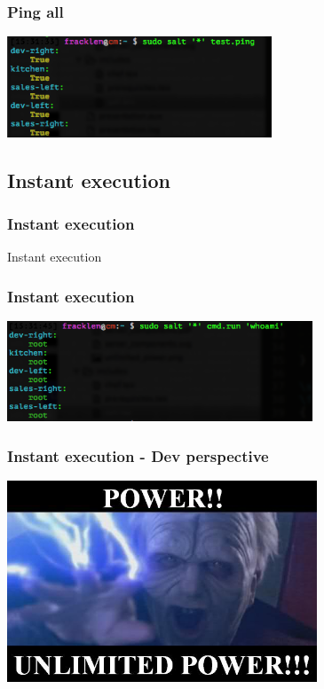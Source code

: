 \frame
{
  \frametitle{Ping all}

  \begin{center}%
    \includegraphics[height=3cm]{images/salt_ping.png}
  \end{center}%
}

\subsection{Instant execution}
\frame
{
  \frametitle{Instant execution}

  \begin{center}%
    \Huge Instant execution
  \end{center}%
}

\frame
{
  \frametitle{Instant execution}

  \begin{center}%
    \includegraphics[height=3cm]{images/salt_cmd.png}
  \end{center}%
}

\frame
{
  \frametitle{Instant execution - Dev perspective}

  \begin{center}%
    \includegraphics[height=6cm]{images/unlimited_power.png}
  \end{center}%
}

